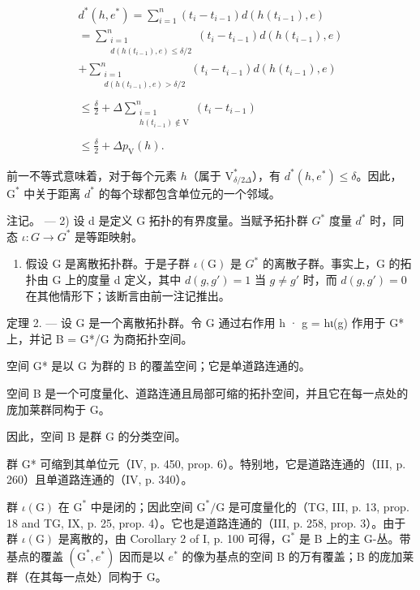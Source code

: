\[
\begin{array}{l}d^{*}(h,e^{*}) = \sum_{i = 1}^{n}(t_{i} - t_{i - 1})d(h(t_{i - 1}),e)\\ = \sum_{\substack{i = 1\\ d(h(t_{i - 1}),e)\leqslant \delta /2}}^{n}(t_{i} - t_{i - 1})d(h(t_{i - 1}),e)\\ +\sum_{\substack{i = 1\\ d(h(t_{i - 1}),e) > \delta /2}}^{n}(t_{i} - t_{i - 1})d(h(t_{i - 1}),e)\\ \\ \leqslant \frac{\delta}{2} +\Delta \sum_{\substack{i = 1\\ h(t_{i - 1})\not\in\mathrm{V}}}^{n}(t_{i} - t_{i - 1})\\ \\ \leqslant \frac{\delta}{2} +\Delta p_{\mathrm{V}}(h). \end{array}
\]

前一不等式意味着，对于每个元素 \(h\)（属于 \(\mathrm{V}_{\delta/2\Delta}^{*}\)），有 \(d^{*}(h,e^{*})\leqslant\delta\)。因此，\(\mathrm{G}^{*}\) 中关于距离 \(d^{*}\) 的每个球都包含单位元的一个邻域。

注记。 --- 2) 设 d 是定义 G 拓扑的有界度量。当赋予拓扑群 \(G^{*}\) 度量 \(d^{*}\) 时，同态 \(\iota: G \to G^{*}\) 是等距映射。

\begin{enumerate}
\def\labelenumi{\arabic{enumi})}
\setcounter{enumi}{2}
\tightlist
\item
假设 G 是离散拓扑群。于是子群 \(\iota(\mathrm{G})\) 是 \(G^{*}\) 的离散子群。事实上，G 的拓扑由 G 上的度量 d 定义，其中 \(d(g,g') = 1\) 当 \(g \neq g'\) 时，而 \(d(g, g') = 0\) 在其他情形下；该断言由前一注记推出。
\end{enumerate}

定理 2. --- 设 G 是一个离散拓扑群。令 G 通过右作用 h · g = hι(g) 作用于 G* 上，并记 B = G*/G 为商拓扑空间。

空间 G* 是以 G 为群的 B 的覆盖空间；它是单道路连通的。

空间 B 是一个可度量化、道路连通且局部可缩的拓扑空间，并且它在每一点处的庞加莱群同构于 G。

因此，空间 B 是群 G 的分类空间。

群 G* 可缩到其单位元（IV, p. 450, prop. 6）。特别地，它是道路连通的（III, p. 260）且单道路连通的（IV, p. 340）。

群 \(\iota(\mathrm{G})\) 在 \(\mathrm{G}^*\) 中是闭的；因此空间 \(\mathrm{G}^*/\mathrm{G}\) 是可度量化的（TG, III, p. 13, prop. 18 and TG, IX, p. 25, prop. 4）。它也是道路连通的（III, p. 258, prop. 3）。由于群 \(\iota(\mathrm{G})\) 是离散的，由 Corollary 2 of I, p. 100 可得，\(\mathrm{G}^*\) 是 B 上的主 G-丛。带基点的覆盖 \((\mathrm{G}^*, e^*)\) 因而是以 \(e^*\) 的像为基点的空间 B 的万有覆盖；B 的庞加莱群（在其每一点处）同构于 G。

